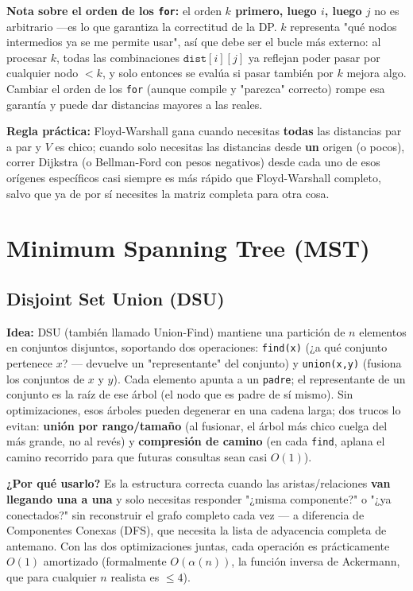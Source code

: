 \documentclass[10pt,a4paper,twocolumn]{article}
\begin{document}
\textbf{Nota sobre el orden de los \texttt{for}:} el orden
\textbf{$k$ primero, luego $i$, luego $j$} no es arbitrario —es lo
que garantiza la correctitud de la DP. $k$ representa "qué nodos
intermedios ya se me permite usar", así que debe ser el bucle más
externo: al procesar $k$, todas las combinaciones $\texttt{dist}[i][j]$
ya reflejan poder pasar por cualquier nodo $< k$, y solo entonces se
evalúa si pasar también por $k$ mejora algo. Cambiar el orden de los
\texttt{for} (aunque compile y "parezca" correcto) rompe esa garantía
y puede dar distancias mayores a las reales.

\textbf{Regla práctica:} Floyd-Warshall gana cuando necesitas
\textbf{todas} las distancias par a par y $V$ es chico; cuando solo
necesitas las distancias desde \textbf{un} origen (o pocos), correr
Dijkstra (o Bellman-Ford con pesos negativos) desde cada uno de esos
orígenes específicos casi siempre es más rápido que Floyd-Warshall
completo, salvo que ya de por sí necesites la matriz completa para
otra cosa.


\section{Minimum Spanning Tree (MST)}
\subsection{Disjoint Set Union (DSU)}

\textbf{Idea:} DSU (también llamado Union-Find) mantiene una
partición de $n$ elementos en conjuntos disjuntos, soportando dos
operaciones: \texttt{find(x)} (¿a qué conjunto pertenece $x$? —
devuelve un "representante" del conjunto) y \texttt{union(x,y)}
(fusiona los conjuntos de $x$ y $y$). Cada elemento apunta a un
\texttt{padre}; el representante de un conjunto es la raíz de ese
árbol (el nodo que es padre de sí mismo). Sin optimizaciones, esos
árboles pueden degenerar en una cadena larga; dos trucos lo evitan:
\textbf{unión por rango/tamaño} (al fusionar, el árbol más chico
cuelga del más grande, no al revés) y \textbf{compresión de camino}
(en cada \texttt{find}, aplana el camino recorrido para que futuras
consultas sean casi $O(1)$).

\textbf{¿Por qué usarlo?} Es la estructura correcta cuando las
aristas/relaciones \textbf{van llegando una a una} y solo necesitas
responder "¿misma componente?" o "¿ya conectados?" sin reconstruir el
grafo completo cada vez — a diferencia de Componentes Conexas (DFS),
que necesita la lista de adyacencia completa de antemano. Con las dos
optimizaciones juntas, cada operación es prácticamente $O(1)$
amortizado (formalmente $O(\alpha(n))$, la función inversa de Ackermann,
que para cualquier $n$ realista es $\le 4$).
\end{document}
